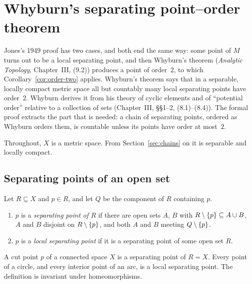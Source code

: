 \chapter{Whyburn's separating point--order theorem}\label{ch:whyburn}

Jones's 1949 proof has two cases, and both end the same way: some point of $M$ turns out to be a local separating
point, and then Whyburn's theorem (\emph{Analytic Topology}, Chapter~III, (9.2)) produces a point of order~$2$, to
which Corollary~\ref{cor:order-two} applies. Whyburn's theorem says that in a separable, locally compact metric space
all but countably many local separating points have order~$2$. Whyburn derives it from his theory of cyclic
elements and of ``potential order'' relative to a collection of sets (Chapter~III, \S\S1--2, (8.1)--(8.4)). The
formal proof extracts the part that is needed: a chain of separating points, ordered as Whyburn orders them, is
countable unless its points have order at most~$2$.

Throughout, $X$ is a metric space. From Section~\ref{sec:chains} on it is separable and locally compact.

\section{Separating points of an open set}

\begin{definition}\label{def:sep-point}
Let $R\subseteq X$ and $p\in R$, and let $Q$ be the component of $R$ containing $p$.
\begin{enumerate}[label=(\alph*)]
\item $p$ is a \emph{separating point of $R$} if there are open sets $A$, $B$ with $R\setminus\left\{ p \right\}\subseteq A\cup B$, $A$ and $B$
disjoint on $R\setminus\left\{ p \right\}$, and both $A$ and $B$ meeting $Q\setminus\left\{ p \right\}$.
\item $p$ is a \emph{local separating point} if it is a separating point of some open set $R$.
\end{enumerate}
\end{definition}


A cut point $p$ of a connected space $X$ is a separating point of $R=X$. Every point of a circle, and every interior point
of an arc, is a local separating point. The definition is invariant under homeomorphisms.

